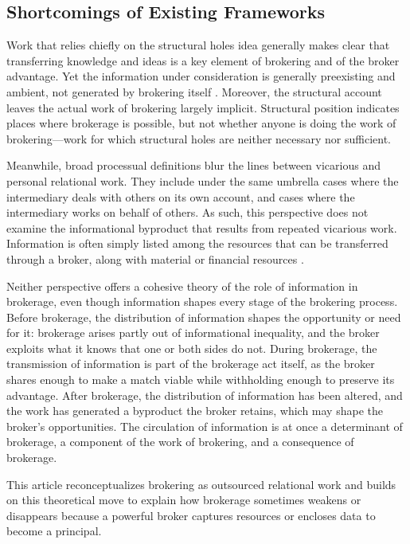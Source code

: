 \documentclass[
]{article}
\begin{document}
\subsection{Shortcomings of Existing Frameworks}

Work that relies chiefly on the structural holes idea generally makes clear that transferring knowledge and ideas is a key element of brokering and of the broker advantage. Yet the information under consideration is generally preexisting and ambient, not generated by brokering itself \autocite{burtStructuralHolesGood2004}. Moreover, the structural account leaves the actual work of brokering largely implicit. Structural position indicates places where brokerage is possible, but not whether anyone is doing the work of brokering---work for which structural holes are neither necessary nor sufficient.

Meanwhile, broad processual definitions blur the lines between vicarious and personal relational work. They include under the same umbrella cases where the intermediary deals with others on its own account, and cases where the intermediary works on behalf of others. As such, this perspective does not examine the informational byproduct that results from repeated vicarious work. Information is often simply listed among the resources that can be transferred through a broker, along with material or financial resources \autocites[see, e.g.][141]{obstfeldBrokerageProcessDecoupling2014}[141]{stovelBrokerage2012}.

Neither perspective offers a cohesive theory of the role of information in brokerage, even though information shapes every stage of the brokering process. Before brokerage, the distribution of information shapes the opportunity or need for it: brokerage arises partly out of informational inequality, and the broker exploits what it knows that one or both sides do not. During brokerage, the transmission of information is part of the brokerage act itself, as the broker shares enough to make a match viable while withholding enough to preserve its advantage. After brokerage, the distribution of information has been altered, and the work has generated a byproduct the broker retains, which may shape the broker's opportunities. The circulation of information is at once a determinant of brokerage, a component of the work of brokering, and a consequence of brokerage.

This article reconceptualizes brokering as outsourced relational work and builds on this theoretical move to explain how brokerage sometimes weakens or disappears because a powerful broker captures resources or encloses data to become a principal.
\end{document}
